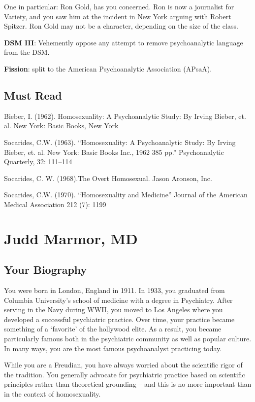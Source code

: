 \begin{refsection}
One in particular: Ron Gold, has you concerned. Ron is now a journalist for Variety, and you saw him at the incident in New York arguing with Robert Spitzer. Ron Gold may not be a character, depending on the size of the class.

\textbf{DSM III}: Vehemently oppose any attempt to remove psychoanalytic language from the DSM.

\textbf{Fission}: split to the American Psychoanalytic Association (APsaA).

\section{Must Read}
\label{mustread}

Bieber, I. (1962). Homosexuality: A Psychoanalytic Study: By Irving Bieber, et. al. New York: Basic Books, New York

Socarides, C.W. (1963). ``Homosexuality: A Psychoanalytic Study: By Irving Bieber, et. al. New York: Basic Books Inc., 1962 385 pp.'' Psychoanalytic Quarterly, 32: 111--114

Socarides, C. W. (1968).The Overt Homosexual. Jason Aronson, Inc.

Socarides, C.W. (1970). ``Homosexuality and Medicine'' Journal of the American Medical Association 212 (7): 1199

\chapter{Judd Marmor, MD}
\label{juddmarmormd}

\section{Your Biography}
\label{yourbiography}

You were born in London, England in 1911. In 1933, you graduated from Columbia University's school of medicine with a degree in Psychiatry. After serving in the Navy during WWII, you moved to Los Angeles where you developed a successful psychiatric practice. Over time, your practice became something of a `favorite' of the hollywood elite. As a result, you became particularly famous both in the psychiatric community as well as popular culture. In many ways, you are the most famous psychoanalyst practicing today.

While you are a Freudian, you have always worried about the scientific rigor of the tradition. You generally advocate for psychiatric practice based on scientific principles rather than theoretical grounding – and this is no more important than in the context of homosexuality.


\end{refsection}
